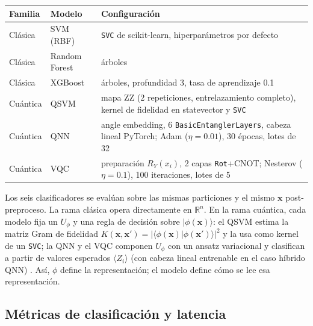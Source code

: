 \begin{center}
\small
\begin{tabularx}{\linewidth}{@{}l>{\raggedright\arraybackslash}p{3.3cm}>{\raggedright\arraybackslash}X@{}}
\toprule
\textbf{Familia} & \textbf{Modelo} & \textbf{Configuración} \\
\midrule
Clásica & SVM (RBF) \citep{cortes1995} & \texttt{SVC} de scikit-learn, hiperparámetros por defecto \\
Clásica & Random Forest \citep{breiman2001} & 100 árboles \\
Clásica & XGBoost \citep{chen2016} & 100 árboles, profundidad 3, tasa de aprendizaje 0.1 \\
Cuántica & QSVM \citep{havlicek2019} & mapa ZZ (2 repeticiones, entrelazamiento completo), kernel de fidelidad en statevector y \texttt{SVC} \\
Cuántica & QNN \citep{pennylaneTransferLearning} & angle embedding, 6 \texttt{BasicEntanglerLayers}, cabeza lineal PyTorch; Adam ($\eta=0.01$), 30 épocas, lotes de 32 \\
Cuántica & VQC \citep{pennylaneVariationalClassifier} & preparación $R_Y(x_i)$, 2 capas \texttt{Rot}+CNOT; Nesterov ($\eta=0.1$), 100 iteraciones, lotes de 5 \\
\bottomrule
\end{tabularx}
\label{tab:modelos_clasif}
\end{center}

Los seis clasificadores se evalúan sobre las mismas particiones y el mismo $\mathbf{x}$ post-preproceso. La rama clásica opera directamente en $\mathbb{R}^{n}$. En la rama cuántica, cada modelo fija un $U_{\phi}$ y una regla de decisión sobre $\lvert\phi(\mathbf{x})\rangle$: el QSVM estima la matriz Gram de fidelidad $K(\mathbf{x},\mathbf{x}')=\lvert\langle\phi(\mathbf{x})\vert\phi(\mathbf{x}')\rangle\rvert^{2}$ y la usa como kernel de un \texttt{SVC}; la QNN y el VQC componen $U_{\phi}$ con un ansatz variacional y clasifican a partir de valores esperados $\langle Z_i\rangle$ (con cabeza lineal entrenable en el caso híbrido QNN) \citep{havlicek2019, pennylaneVariationalClassifier, cerezo2021}. Así, $\phi$ define la representación; el modelo define cómo se lee esa representación.

\subsection{Métricas de clasificación y latencia}


